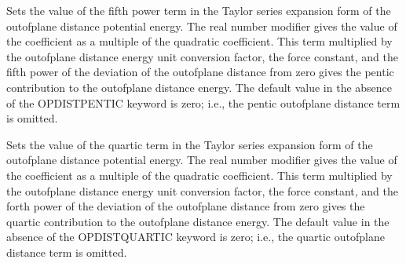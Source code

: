 \documentclass[letterpaper,11pt,english]{sphinxmanual}
\begin{document}
\ignorespaces {}\label{\detokenize{text/keywords:key-opdist-pentic}}\begin{description}
\sphinxAtStartPar
Sets the value of the fifth power term in the Taylor series expansion form of the out\sphinxhyphen{}of\sphinxhyphen{}plane distance potential energy. The real number modifier gives the value of the coefficient as a multiple of the quadratic coefficient. This term multiplied by the out\sphinxhyphen{}of\sphinxhyphen{}plane distance energy unit conversion factor, the force constant, and the fifth power of the deviation of the out\sphinxhyphen{}of\sphinxhyphen{}plane distance from zero gives the pentic contribution to the out\sphinxhyphen{}of\sphinxhyphen{}plane distance energy. The default value in the absence of the OPDIST\sphinxhyphen{}PENTIC keyword is zero; i.e., the pentic out\sphinxhyphen{}of\sphinxhyphen{}plane distance term is omitted.

\end{description}

\ignorespaces {}\label{\detokenize{text/keywords:key-opdist-quartic}}\begin{description}
\sphinxAtStartPar
Sets the value of the quartic term in the Taylor series expansion form of the out\sphinxhyphen{}of\sphinxhyphen{}plane distance potential energy. The real number modifier gives the value of the coefficient as a multiple of the quadratic coefficient. This term multiplied by the out\sphinxhyphen{}of\sphinxhyphen{}plane distance energy unit conversion factor, the force constant, and the forth power of the deviation of the out\sphinxhyphen{}of\sphinxhyphen{}plane distance from zero gives the quartic contribution to the out\sphinxhyphen{}of\sphinxhyphen{}plane distance energy. The default value in the absence of the OPDIST\sphinxhyphen{}QUARTIC keyword is zero; i.e., the quartic out\sphinxhyphen{}of\sphinxhyphen{}plane distance term is omitted.

\end{description}
\end{document}

